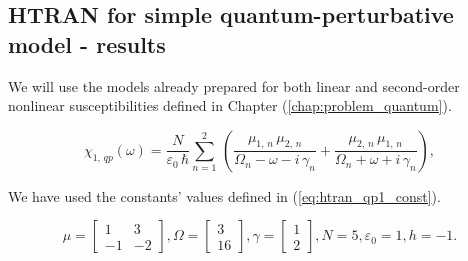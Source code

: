 \documentclass[12pt,twoside,a4paper]{article}
\numberwithin{equation}{subsection}
\numberwithin{figure}{subsection}
\begin{document}
\subsection{HTRAN for simple quantum-perturbative model - results} \label{chap:htran_quantum}

We will use the models already prepared for both linear and second-order nonlinear susceptibilities defined in Chapter (\ref{chap:problem_quantum}).

\begin{equation} \label{eq:htran_qpeq}
  \chi_{1, \,qp}(\omega ) = 
  \frac{N}{\varepsilon_0\,\hbar} \sum_{n=1}^{2}\,(\frac {{\mu_{1, \,n}}\,{\mu_{2, \,n}}}{{\Omega_{n}} - \omega -
  i\,{\gamma_{n}}} + \frac {{\mu_{2, \,n}}\,{\mu_{1, \,n}}}{{\Omega_{n}} + \omega + i\,{\gamma_{n}}}) ,
\end{equation}

We have used the constants' values defined in (\ref{eq:htran_qp1_const}). 

\begin{equation} \label{eq:htran_qp1_const}
  \mu = \begin{bmatrix} 
          1  & 3 \\ 
          -1 & -2
        \end{bmatrix},
  \Omega = \begin{bmatrix}
           3 \\ 16
           \end{bmatrix},
  \gamma = \begin{bmatrix}
           1 \\ 2
           \end{bmatrix}, 
  N = 5, 
  \varepsilon_0 = 1, 
  h = -1.
\end{equation}
\end{document}
